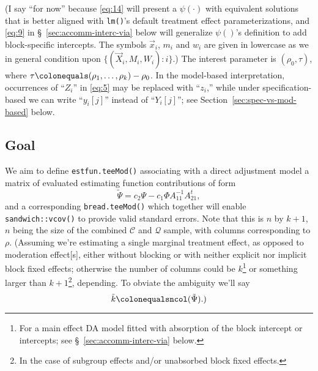\documentclass{article}
\newcommand{\defeq}{\ensuremath{\colonequals}}
\begin{document}
(I say ``for now'' because \eqref{eq:14} will present a
$\psi(\cdot)$ with equivalent solutions that is better aligned with
\texttt{lm()}'s default treatment effect parameterizations, and
\eqref{eq:9} in \S~\ref{sec:accomm-interc-via} below will generalize $\psi()$'s definition
to add block-specific intercepts.  The symbols $\vec{x}_{i}$, $m_{i}$
and $w_{i}$ are given in lowercase as we in general condition upon
$\{(\vec{X}_{i}, M_{i}, W_{i}): i\}$.)
The interest parameter is $(\rho_{0}, \tau)$, where $\tau \defeq (\rho_{1}, \ldots, \rho_{k}) - \rho_{0}$. In the model-based interpretation, occurrences of ``$Z_{i}$'' in \eqref{eq:5} may be replaced with ``$z_{i}$,'' while under specification-based we can write ``$y_{i}[j]$'' instead of ``$Y_{i}[j]$''; see Section~\ref{sec:spec-vs-mod-based} below.

\subsection{Goal} \label{sec:goal}
We aim to define \texttt{estfun.teeMod()} associating
with a direct adjustment model a matrix of evaluated estimating function
contributions of form
\begin{equation} \label{eq:22}
  \tilde{\Psi} = c_{2}\Psi - c_{1}\Phi A_{11}^{-1}A_{21}^{t},
\end{equation}
and a corresponding \texttt{bread.teeMod()} which together will enable \texttt{sandwich::vcov()} to provide valid standard errors.
Note that this is $n$ by
$k+1$, $n$ being the size of the combined $\mathcal{C}$ and
$\mathcal{Q}$ sample, with columns corresponding to $\rho$.%
(Assuming we're estimating a single marginal treatment effect, as
opposed to moderation effect[s], either without blocking or with
neither explicit nor implicit block fixed effects; otherwise the
number of columns could be $k$\footnote{For a main effect
DA model fitted with absorption of the block intercept or
intercepts; see \S~\ref{sec:accomm-interc-via} below.} or something
larger than $k+1$\footnote{In the case of subgroup effects and/or unabsorbed block fixed effects.},
depending. To obviate the ambiguity we'll say
\begin{equation*}
  \tilde{k} \defeq \mathtt{ncol}(\tilde{\Psi}).)
\end{equation*}
\end{document}
